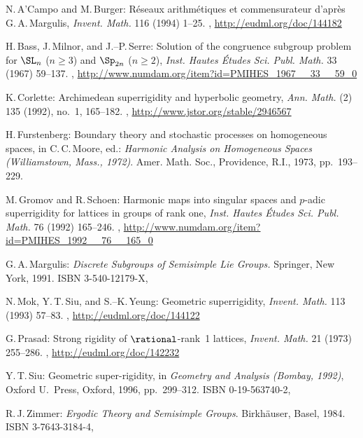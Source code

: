 \begin{references}{9}

N.\,A'Campo and M.\,Burger:
R\'eseaux arithm\'etiques et commensurateur d'apr\`es G.\,A.\,Margulis,
\emph{Invent. Math.} 116 (1994) 1--25. 
,
  \maynewline
  \url{http://eudml.org/doc/144182}

H.\,Bass, J.\,Milnor, and J.--P.\,Serre:
Solution of the congruence subgroup problem for $\SL_n$ ($n \ge 3$) and $\Sp_{2n}$ ($n\ge 2$),
\emph{Inst. Hautes \'Etudes Sci. Publ. Math.} 33 (1967) 59--137. 
,
\url{http://www.numdam.org/item?id=PMIHES_1967__33__59_0}

K.\,Corlette:
Archimedean superrigidity and hyperbolic geometry,
\emph{Ann. Math.} (2) 135 (1992), no.~1, 165--182. 
,
\url{http://www.jstor.org/stable/2946567}

H.\,Furstenberg:
Boundary theory and stochastic processes on homogeneous spaces, in
C.\,C.\,Moore, ed.:
\emph{Harmonic Analysis on Homogeneous Spaces 
(Williamstown, Mass., 1972)}. 
Amer. Math. Soc., Providence, R.I., 1973,
pp.~193--229.

M.\,Gromov and R.\,Schoen:
Harmonic maps into singular spaces and $p$-adic superrigidity for lattices in groups of rank one,
\emph{Inst. Hautes \'Etudes Sci. Publ. Math.} 76 (1992) 165--246. 
,
\url{http://www.numdam.org/item?id=PMIHES_1992__76__165_0}

 G.\,A.\,Margulis:
 \emph{Discrete Subgroups of Semisimple Lie Groups.}
 Springer, {New York}, 1991.
 ISBN 3-540-12179-X,

N.\,Mok, Y.\,T.\,Siu, and S.--K.\,Yeung:
 Geometric superrigidity,
 \emph{Invent. Math.} 113 (1993) 57--83.
,
\maynewline
\url{http://eudml.org/doc/144122}

 G.\,Prasad:
 Strong rigidity of $\rational$-rank~1 lattices,
 \emph{Invent. Math.} 21 (1973) 255--286.
 ,
 \maynewline
\url{http://eudml.org/doc/142232}

Y.\,T.\,Siu:
Geometric super-rigidity, in \emph{Geometry and Analysis (Bombay, 1992)},
Oxford U.\ Press, Oxford, 1996, pp.~299--312.
ISBN 0-19-563740-2,

R.\,J.\,Zimmer:
\emph{Ergodic Theory and Semisimple Groups}.
Birkh\"auser, Basel, 1984.
ISBN 3-7643-3184-4,



\end{references}